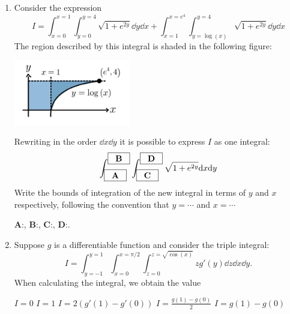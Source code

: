 \documentclass[12pt]{exam}
\begin{document}
\begin{enumerate} 


\item Consider the expression
$$I=\int_{x=0}^{x=1}\int_{y=0}^{y=4}\sqrt{1+e^{2y}}\dd y\dd x+\int_{x=1}^{x=e^4}\int_{y=\log(x)}^{y=4}\sqrt{1+e^{2y}}\dd y\dd x$$
The region described by this integral is shaded in the following figure:
\begin{center}
    \includegraphics[width=0.4\textwidth]{fig2}
\end{center}
Rewriting in the order $\dd x \dd y$ it is possible to express $I$ as one integral:
$$\int_{\fbox{\hspace{2mm}\textbf{A}\hspace{2mm}}}^{\fbox{\hspace{2mm}\textbf{B}\hspace{2mm}}}\int_{\fbox{\hspace{2mm}\textbf{C}\hspace{2mm}}}^{\fbox{\hspace{2mm}\textbf{D}\hspace{2mm}}}\sqrt{1+e^{2y}}\dd x\dd y$$
Write the bounds of integration of the new integral in terms of $y$ and $x$ respectively, following the convention that $y=\cdots$ and $x=\cdots$\par
\begin{center}
    \textbf{A}:\fillin[$y=0$][1in], \textbf{B}:\fillin[$y=4$][1in], \textbf{C}:\fillin[$x=0$][1in], \textbf{D}:\fillin[$x=e^y$][1in].
\end{center}

\item Suppose $g$ is a differentiable function and consider the triple integral:
$$I=\int_{y=-1}^{y=1}\int_{x=0}^{x=\pi/2}\int_{z=0}^{z=\sqrt{\cos(x)}}zg'(y)\dd z\dd x\dd y.$$
When calculating the integral, we obtain the value
    \begin{checkboxes}
        \choice $I=0$
        \choice $I=1$
        \choice $I=2(g'(1)-g'(0))$
        \choice $I=\frac{g(1)-g(0)}{2}$
        \choice $I=g(1)-g(0)$
    \end{checkboxes}
\newpage


\end{enumerate}
\end{document}

